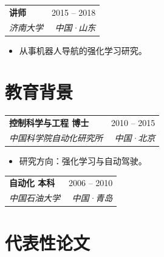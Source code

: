 \documentclass[10pt, a4paper]{article}
\makeatletter
\newcommand{\cventry}[4]{%
  \begin{tabular*}{\linewidth}{@{}l@{\extracolsep{\fill}}r@{}}
    \textbf{#1} & {#4} \\[-0.1em]
    \textit{\small #2} & \textit{\small #3}
  \end{tabular*}%
  \vspace{0.1em}%
}
\makeatother
\begin{document}
\vspace{0.35em}
\cventry{讲师}{济南大学}{中国·山东}{2015 -- 2018}
\begin{itemize}[leftmargin=1.5em, itemsep=0.1em, topsep=0.15em, parsep=0pt, label=\textbullet]
  \item {\small 从事机器人导航的强化学习研究。}
\end{itemize}

\section{教育背景}

\cventry{控制科学与工程 博士}%
        {中国科学院自动化研究所}%
        {中国·北京}{2010 -- 2015}
\begin{itemize}[leftmargin=1.5em, itemsep=0.1em, topsep=0.15em, parsep=0pt, label=\textbullet]
  \item {\small 研究方向：强化学习与自动驾驶。}
\end{itemize}

\vspace{0.35em}
\cventry{自动化 本科}{中国石油大学}{中国·青岛}{2006 -- 2010}

\section{代表性论文}
\end{document}
